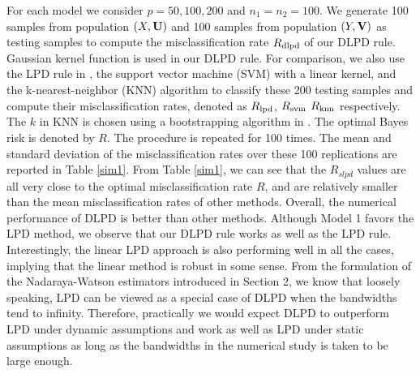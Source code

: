 \documentclass[11pt]{article}
\theoremstyle{definition}
\begin{document}
 
 
 For each model we consider $p=50,100, 200$ and $n_1=n_2=100$. We generate 100 samples from population $(X,{\bf U})$ and 100 samples from population $(Y,{\bf V})$ as testing samples to compute the misclassification rate $R_{\rm dlpd}$ of our DLPD rule. Gaussian kernel function is used in our DLPD rule. For comparison, we also use the LPD rule in \cite{Cai}, the support vector machine (SVM) with a linear kernel, and the k-nearest-neighbor (KNN) algorithm to classify these 200 testing samples and compute their misclassification rates, denoted as $R_{\rm lpd}$, $R_{\rm svm}$ $R_{\rm knn}$ respectively.  The  $k$ in KNN is chosen using a bootstrapping algorithm in \cite{ph}.   The optimal Bayes risk is denoted by $R$. The procedure is repeated for 100 times. The mean and standard deviation of the misclassification rates over these 100 replications are reported in Table \ref{sim1}.  %
 From Table \ref{sim1}, we can see that the $R_{slpd}$ values are all very close to the optimal misclassification rate $R$, and are relatively smaller than the mean misclassification rates of other methods. Overall, the numerical performance of DLPD is better than other methods. Although Model 1 favors the LPD method, we observe that our DLPD rule works as well as the LPD rule. Interestingly, the linear LPD approach is also performing well in all the cases, implying that the linear method is robust in some sense. From the formulation of the Nadaraya-Watson estimators introduced in Section 2, we know that loosely speaking, LPD can be viewed as a special case of DLPD when the bandwidths tend to infinity. Therefore, practically we would expect DLPD to outperform LPD under dynamic assumptions and work as well as LPD under static assumptions as long as the bandwidths in the numerical study is taken to be large enough.
 
\end{document}
